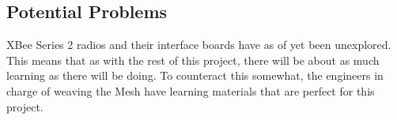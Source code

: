 \subsection{Potential Problems}
XBee Series 2 radios and their interface boards have as of yet been unexplored. 
This means that as with the rest of this project, there will be about as much learning as there will be doing. 
To counteract this somewhat, the engineers in charge of weaving the Mesh have learning materials that are perfect for this project. 